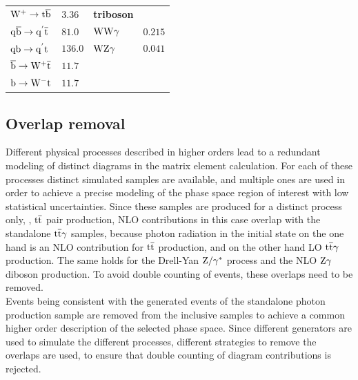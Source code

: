 \begin{table}[tbp]
\begin{tabular}[width=\textwidth]{ll|ll}
  $\mathrm{W^+}\to\mathrm{t}\overline{\mathrm{b}}$                             & $3.36$                               & \textbf{triboson}                            &                                      \\
  $\mathrm{q}\overline{\mathrm{b}}\to\mathrm{q}^{'}\overline{\mathrm{t}}$                    & $81.0$                               & $\mathrm{W}\mathrm{W}\gamma$                                 & $0.215$                              \\
  $\mathrm{q}\mathrm{b}\to\mathrm{q}^{'}\mathrm{t}$                      & $136.0$                              & $\mathrm{W}\mathrm{Z}\gamma$                                 & $0.041$                              \\
  $\overline{\mathrm{b}}\to\mathrm{W^+}\overline{\mathrm{t}}$                            & $11.7$                               &                                              &                                      \\
  $\mathrm{b}\to\mathrm{W^-}\mathrm{t}$                              & $11.7$                               &                                              &                                      \\
  \hline
 \end{tabular}
 \vspace{\baselineskip}
\end{table}

\subsection*{Overlap removal}\label{sec:overlap}

Different physical processes described in higher orders lead to a redundant modeling of distinct diagrams in the matrix element calculation. For each of these processes distinct simulated samples are available, and multiple ones are used in order to achieve a precise modeling of the phase space region of interest with low statistical uncertainties. Since these samples are produced for a distinct process only, \eg, ${\mathrm{t}\overline{\mathrm{t}}}$ pair production, NLO contributions in this case overlap with the standalone ${\mathrm{t}\overline{\mathrm{t}}}\gamma$ samples, because photon radiation in the initial state on the one hand is an NLO contribution for ${\mathrm{t}\overline{\mathrm{t}}}$ production, and on the other hand LO ${\mathrm{t}\overline{\mathrm{t}}}\gamma$ production. The same holds for the Drell-Yan $\mathrm{Z}/\gamma^{*}$ process and the NLO $\mathrm{Z}\gamma$ diboson production. To avoid double counting of events, these overlaps need to be removed.\\
Events being consistent with the generated events of the standalone photon production sample are removed from the inclusive samples to achieve a common higher order description of the selected phase space. Since different generators are used to simulate the different processes, different strategies to remove the overlaps are used, to ensure that double counting of diagram contributions is rejected.


